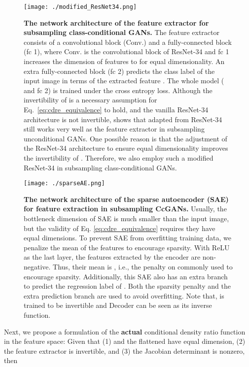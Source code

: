 \documentclass[final,12pt, 3p,times]{elsarticle}
\begin{document}
\begin{figure}[t]
	\centering
	\texttt{[image: ./modified\_ResNet34.png]}
	\caption{\textbf{The network architecture of the feature extractor  for subsampling class-conditional GANs.} The feature extractor  consists of a convolutional block (Conv.) and a fully-connected block (fc 1), where Conv. is the convolutional block of ResNet-34 and fc 1 increases the dimension of features to  for equal dimensionality. An extra fully-connected block (fc 2) predicts the class label  of the input image  in terms of the extracted feature . The whole model ( and fc 2) is trained under the cross entropy loss. Although the invertibility of  is a necessary assumption for Eq.\ \eqref{eq:cdre_equivalence} to hold, and the vanilla ResNet-34 architecture is not invertible, \cite{ding2020subsampling} shows that  adapted from ResNet-34 still works very well as the feature extractor in subsampling unconditional GANs. One possible reason is that the adjustment of the ResNet-34 architecture to ensure equal dimensionality improves the invertibility of . Therefore, we also employ such a modified ResNet-34 in subsampling class-conditional GANs.}
	\label{fig:mod_resnet34}
\end{figure}

\begin{figure}[t]
	\centering
	\texttt{[image: ./sparseAE.png]}
	\caption{\textbf{The network architecture of the sparse autoencoder (SAE) for feature extraction in subsampling CcGANs.} Usually, the bottleneck dimension of SAE is much smaller than the input image, but the validity of Eq. \eqref{eq:cdre_equivalence} requires they have equal dimensions. To prevent SAE from overfitting training data, we penalize the mean of the features to encourage sparsity. With ReLU as the last layer, the features  extracted by the encoder are non-negative. Thus, their mean   is , i.e., the  penalty on  commonly used to encourage sparsity. Additionally, this SAE also has an extra branch to predict the regression label of . Both the sparsity penalty and the extra prediction branch are used to avoid overfitting. Note that,  is trained to be invertible and Decoder can be seen as its inverse function.}
	\label{fig:sparseAE}
\end{figure}


Next, we propose a formulation of the \textbf{actual} conditional density ratio function in the feature space: Given that (1)  and the flattened  have equal dimension, (2) the feature extractor  is invertible, and (3) the Jacobian determinant  is nonzero, then
\end{document}
